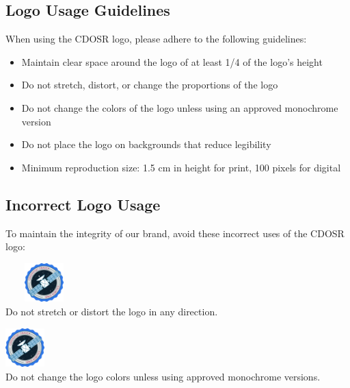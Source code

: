 \documentclass[11pt]{article}
\newcommand{\badexample}[2]{%
\begin{tcolorbox}[
  colback=CDOSRBackground,
  colframe=CDOSRAccent,
  title={\textbf{INCORRECT: #1}},
  width=0.95\linewidth,
  arc=2mm,
  boxrule=0.5pt
]
#2
\end{tcolorbox}
}
\begin{document}
\subsection{Logo Usage Guidelines}

When using the CDOSR logo, please adhere to the following guidelines:

\begin{itemize}[leftmargin=1cm, itemindent=0.25cm, noitemsep, topsep=0pt, label=$\bullet$]
    \item Maintain clear space around the logo of at least 1/4 of the logo's height
    \item Do not stretch, distort, or change the proportions of the logo
    \item Do not change the colors of the logo unless using an approved monochrome version
    \item Do not place the logo on backgrounds that reduce legibility
    \item Minimum reproduction size: 1.5 cm in height for print, 100 pixels for digital
\end{itemize}

\subsection{Incorrect Logo Usage}

To maintain the integrity of our brand, avoid these incorrect uses of the CDOSR logo:

\begin{multicols}{2}
\badexample{Stretched Logo}{
    \centering
    \includegraphics[width=3cm, height=1.5cm]{img_CDOSR.png}\\
    \small{Do not stretch or distort the logo in any direction.}
}

\columnbreak

\badexample{Altered Colors}{
    \centering
    \includegraphics[width=1.5cm]{img_CDOSR.png}\\
    \small{Do not change the logo colors unless using approved monochrome versions.}
}
\end{multicols}
\end{document}
